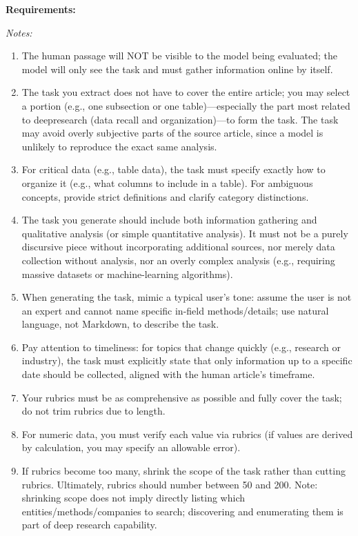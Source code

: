 \documentclass[11pt]{article}
\begin{document}
\begin{tcolorbox}[
  breakable,
  colback=porcelain,
  colframe=gray!75!black,
  left=6pt, right=6pt, top=6pt, bottom=6pt,
  fontupper=\small
]
\textbf{Requirements:}

\textit{Notes:}

\begin{enumerate}
\item The human passage will NOT be visible to the model being evaluated; the model will only see the task and must gather information online by itself.
\item The task you extract does not have to cover the entire article; you may select a portion (e.g., one subsection or one table)---especially the part most related to deepresearch (data recall and organization)---to form the task. The task may avoid overly subjective parts of the source article, since a model is unlikely to reproduce the exact same analysis.
\item For critical data (e.g., table data), the task must specify exactly how to organize it (e.g., what columns to include in a table). For ambiguous concepts, provide strict definitions and clarify category distinctions.
\item The task you generate should include both information gathering and qualitative analysis (or simple quantitative analysis). It must not be a purely discursive piece without incorporating additional sources, nor merely data collection without analysis, nor an overly complex analysis (e.g., requiring massive datasets or machine-learning algorithms).
\item When generating the task, mimic a typical user's tone: assume the user is not an expert and cannot name specific in-field methods/details; use natural language, not Markdown, to describe the task.
\item Pay attention to timeliness: for topics that change quickly (e.g., research or industry), the task must explicitly state that only information up to a specific date should be collected, aligned with the human article's timeframe.
\item Your rubrics must be as comprehensive as possible and fully cover the task; do not trim rubrics due to length.
\item For numeric data, you must verify each value via rubrics (if values are derived by calculation, you may specify an allowable error).
\item If rubrics become too many, shrink the scope of the task rather than cutting rubrics. Ultimately, rubrics should number between 50 and 200. Note: shrinking scope does not imply directly listing which entities/methods/companies to search; discovering and enumerating them is part of deep research capability.

\end{enumerate}
\end{tcolorbox}
\end{document}
